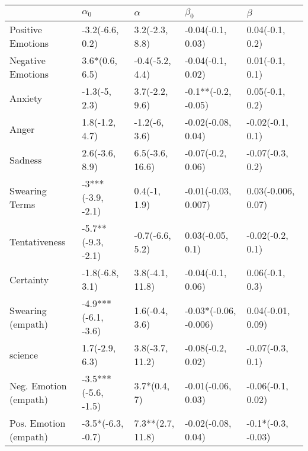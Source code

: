 \begin{tabular}{lllll}
\toprule
{} &           $\alpha_0$ &          $\alpha$ &              $\beta_0$ &             $\beta$ \\
\midrule
Positive Emotions     &      -3.2(-6.6, 0.2) &    3.2(-2.3, 8.8) &      -0.04(-0.1, 0.03) &     0.04(-0.1, 0.2) \\
Negative Emotions     &       3.6*(0.6, 6.5) &   -0.4(-5.2, 4.4) &      -0.04(-0.1, 0.02) &     0.01(-0.1, 0.1) \\
Anxiety               &        -1.3(-5, 2.3) &    3.7(-2.2, 9.6) &    -0.1**(-0.2, -0.05) &     0.05(-0.1, 0.2) \\
Anger                 &       1.8(-1.2, 4.7) &     -1.2(-6, 3.6) &     -0.02(-0.08, 0.04) &    -0.02(-0.1, 0.1) \\
Sadness               &       2.6(-3.6, 8.9) &   6.5(-3.6, 16.6) &      -0.07(-0.2, 0.06) &    -0.07(-0.3, 0.2) \\
Swearing Terms        &    -3***(-3.9, -2.1) &      0.4(-1, 1.9) &    -0.01(-0.03, 0.007) &  0.03(-0.006, 0.07) \\
Tentativeness         &   -5.7**(-9.3, -2.1) &   -0.7(-6.6, 5.2) &       0.03(-0.05, 0.1) &    -0.02(-0.2, 0.1) \\
Certainty             &      -1.8(-6.8, 3.1) &   3.8(-4.1, 11.8) &      -0.04(-0.1, 0.06) &     0.06(-0.1, 0.3) \\
Swearing (empath)     &  -4.9***(-6.1, -3.6) &    1.6(-0.4, 3.6) &  -0.03*(-0.06, -0.006) &   0.04(-0.01, 0.09) \\
science               &       1.7(-2.9, 6.3) &   3.8(-3.7, 11.2) &      -0.08(-0.2, 0.02) &    -0.07(-0.3, 0.1) \\
Neg. Emotion (empath) &  -3.5***(-5.6, -1.5) &      3.7*(0.4, 7) &     -0.01(-0.06, 0.03) &   -0.06(-0.1, 0.02) \\
Pos. Emotion (empath) &    -3.5*(-6.3, -0.7) &  7.3**(2.7, 11.8) &     -0.02(-0.08, 0.04) &  -0.1*(-0.3, -0.03) \\
\bottomrule
\end{tabular}
